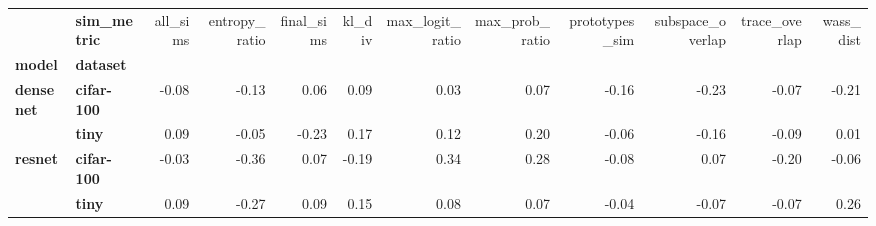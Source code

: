 \begin{tabular}{llrrrrrrrrrr}
\toprule
       & \textbf{sim\_metric} &  all\_sims &  entropy\_ratio &  final\_sims &  kl\_div &  max\_logit\_ratio &  max\_prob\_ratio &  prototypes\_sim &  subspace\_overlap &  trace\_overlap &  wass\_dist \\
\textbf{model} & \textbf{dataset} &           &                &             &         &                  &                 &                 &                   &                &            \\
\midrule
\multirow{2}{*}{\textbf{densenet}} & \textbf{cifar-100} &     -0.08 &          -0.13 &        0.06 &    0.09 &             0.03 &            0.07 &           -0.16 &             -0.23 &          -0.07 &      -0.21 \\
       & \textbf{tiny} &      0.09 &          -0.05 &       -0.23 &    0.17 &             0.12 &            0.20 &           -0.06 &             -0.16 &          -0.09 &       0.01 \\
\cline{1-12}
\multirow{2}{*}{\textbf{resnet}} & \textbf{cifar-100} &     -0.03 &          -0.36 &        0.07 &   -0.19 &             0.34 &            0.28 &           -0.08 &              0.07 &          -0.20 &      -0.06 \\
       & \textbf{tiny} &      0.09 &          -0.27 &        0.09 &    0.15 &             0.08 &            0.07 &           -0.04 &             -0.07 &          -0.07 &       0.26 \\
\bottomrule
\end{tabular}
